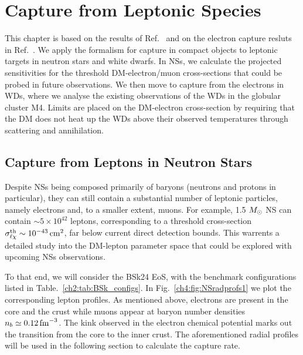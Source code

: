 \graphicspath{{img/capture_leptons/}}

\chapter{Capture from Leptonic Species}
\label{chapter:capture_leptons}

\begin{synopsis}
This chapter is based on the results of Ref.~\cite{Bell:2020lmm_mar_ImprovedTreatmentDark} and on the electron capture resluts in Ref.~\cite{Bell:2021fye_oct_Improvedtreatmentdark}. We apply the formalism for capture in compact objects to leptonic targets in neutron stars and white dwarfs. In NSs, we calculate the projected sensitivities for the threshold DM-electron/muon cross-sections that could be probed in future observations. We then move to capture from the electrons in WDs, where we analyse the existing observations of the WDs in the globular cluster M4. Limits are placed on the DM-electron cross-section by requiring that the DM does not heat up the WDs above their observed temperatures through scattering and annihilation.
\end{synopsis}



\section{Capture from Leptons in Neutron Stars}
\label{ch4:sec:lep_NS}
Despite NSs being composed primarily of baryons (neutrons and protons in particular), they can still contain a substantial number of leptonic particles, namely electrons and, to a smaller extent, muons. For example, 1.5 $M_\odot$ NS can contain $\sim 5\times 10^42$ leptons, corresponding to a threshold cross-section $\sigma^{\rm th}_{\ell\chi}\sim 10^{-43}{\rm \,cm}^2$, far below current direct detection bounds. This warrents a detailed study into the DM-lepton parameter space that could be explored with upcoming NSs observations. 

To that end, we will consider the BSk24 EoS, with the benchmark configurations listed in Table.~\ref{ch2:tab:BSk_configs}.
In Fig.~\ref{ch4:fig:NSradprofs1} we plot the corresponding lepton profiles.
As mentioned above, electrons are present in the core and the crust while muons appear at baryon number densities $n_b\simeq 0.12{\rm \,fm}^{-3}$. The kink observed in the electron chemical potential marks out the transition from the core to the inner crust. 
The aforementioned radial profiles will be used in the following section to calculate the capture rate. 

